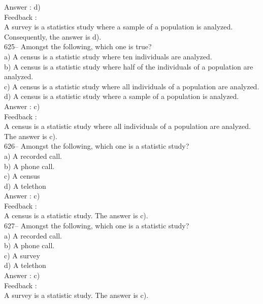 \documentclass[letterpaper, 12pt]{article}
\begin{document}
Answer : d)\\

Feedback : \\
A survey is a statistics study where a sample of a population is analyzed.  Consequently, the answer is d).\\

625-- Amongst the following, which one is true?\\
a) A census is a statistic study where ten individuals are analyzed.\\
b) A census is a statistic study where half of the individuals of a population are analyzed.\\
c) A census is a statistic study where all individuals of a population are analyzed.\\
d) A census is a statistic study where a sample of a population is analyzed.\\

Answer : c)\\

Feedback : \\
A census is a statistic study where all individuals of a population are analyzed.  The answer is c).\\

626-- Amongst the following, which one is a statistic study?\\
a) A recorded call.\\
b) A phone call.\\
c) A census\\
d) A telethon\\

Answer : c)\\

Feedback : \\
A census is a statistic study. The answer is c).\\

627-- Amongst the following, which one is a statistic study?\\
a) A recorded call.\\
b) A phone call.\\
c) A survey\\
d) A telethon\\

Answer : c)\\

Feedback : \\
A survey is a statistic study. The answer is c).\\
\end{document}
